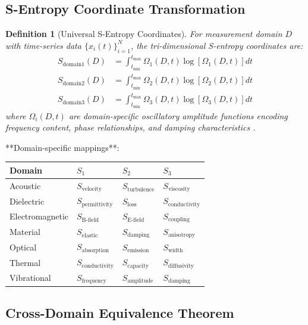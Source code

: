 \documentclass[12pt,a4paper]{article}
\newtheorem{definition}{Definition}
\begin{document}
\subsection{S-Entropy Coordinate Transformation}

\begin{definition}[Universal S-Entropy Coordinates]
For measurement domain $D$ with time-series data $\{x_i(t)\}_{i=1}^{N}$, the tri-dimensional S-entropy coordinates are:
\begin{align}
S_{\text{domain1}}(D) &= \int_{t_{\min}}^{t_{\max}} \Omega_1(D,t) \log[\Omega_1(D,t)] dt \\
S_{\text{domain2}}(D) &= \int_{t_{\min}}^{t_{\max}} \Omega_2(D,t) \log[\Omega_2(D,t)] dt \\
S_{\text{domain3}}(D) &= \int_{t_{\min}}^{t_{\max}} \Omega_3(D,t) \log[\Omega_3(D,t)] dt
\end{align}
where $\Omega_i(D,t)$ are domain-specific oscillatory amplitude functions encoding frequency content, phase relationships, and damping characteristics \cite{sachikonye2024st_stellas}.
\end{definition}

**Domain-specific mappings**:

\begin{center}
\begin{tabular}{llll}
\toprule
\textbf{Domain} & \textbf{$S_1$} & \textbf{$S_2$} & \textbf{$S_3$} \\
\midrule
Acoustic & $S_{\text{velocity}}$ & $S_{\text{turbulence}}$ & $S_{\text{viscosity}}$ \\
Dielectric & $S_{\text{permittivity}}$ & $S_{\text{loss}}$ & $S_{\text{conductivity}}$ \\
Electromagnetic & $S_{\text{B-field}}$ & $S_{\text{E-field}}$ & $S_{\text{coupling}}$ \\
Material & $S_{\text{elastic}}$ & $S_{\text{damping}}$ & $S_{\text{anisotropy}}$ \\
Optical & $S_{\text{absorption}}$ & $S_{\text{emission}}$ & $S_{\text{width}}$ \\
Thermal & $S_{\text{conductivity}}$ & $S_{\text{capacity}}$ & $S_{\text{diffusivity}}$ \\
Vibrational & $S_{\text{frequency}}$ & $S_{\text{amplitude}}$ & $S_{\text{damping}}$ \\
\bottomrule
\end{tabular}
\end{center}

\subsection{Cross-Domain Equivalence Theorem}
\end{document}
